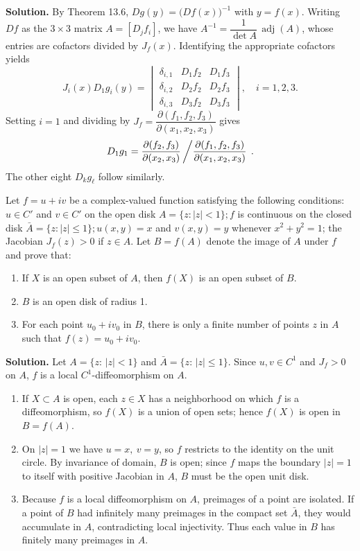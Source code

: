 \noindent\textbf{Solution.}
By Theorem 13.6, $Dg(y)=\big(Df(x)\big)^{-1}$ with $y=f(x)$. Writing $Df$ as the $3\times3$ matrix $A=[D_j f_i]$, we have $A^{-1}=\dfrac{1}{\det A}\,\operatorname{adj}(A)$, whose entries are cofactors divided by $J_f(x)$. Identifying the appropriate cofactors yields
\[J_i(x)D_1g_i(y)=\begin{vmatrix}
\delta_{i,1} & D_1f_2 & D_1f_3\\
\delta_{i,2} & D_2f_2 & D_2f_3\\
\delta_{i,3} & D_3f_2 & D_3f_3
\end{vmatrix},\quad i=1,2,3.
\]
Setting $i=1$ and dividing by $J_f=\dfrac{\partial(f_1,f_2,f_3)}{\partial(x_1,x_2,x_3)}$ gives
\[D_1g_1=\frac{\partial(f_2,f_3)}{\partial(x_2,x_3)}\left/\frac{\partial(f_1,f_2,f_3)}{\partial(x_1,x_2,x_3)}\right.\,.
\]
The other eight $D_k g_\ell$ follow similarly.

\begin{problembox}
Let \( f = u + iv \) be a complex-valued function satisfying the following conditions: \( u \in C' \) and \( v \in C' \) on the open disk \( A = \{z : |z| < 1\}; f \) is continuous on the closed disk \( \bar{A} = \{z : |z| \leq 1\}; u(x, y) = x \) and \( v(x, y) = y \) whenever \( x^2 + y^2 = 1 \); the Jacobian \( J_f(z) > 0 \) if \( z \in A \). Let \( B = f(A) \) denote the image of \( A \) under \( f \) and prove that:
\begin{enumerate}[label=(\alph*)]
    \item If \( X \) is an open subset of \( A \), then \( f(X) \) is an open subset of \( B \).
    \item \( B \) is an open disk of radius 1.
    \item For each point \( u_0 + iv_0 \) in \( B \), there is only a finite number of points \( z \) in \( A \) such that \( f(z) = u_0 + iv_0 \).
\end{enumerate}
\end{problembox}

\noindent\textbf{Solution.}
Let $A=\{z:\,|z|<1\}$ and $\bar A=\{z:\,|z|\le 1\}$. Since $u,v\in C^1$ and $J_f>0$ on $A$, $f$ is a local $C^1$-diffeomorphism on $A$.
\begin{enumerate}[label=(\alph*)]
    \item If $X\subset A$ is open, each $z\in X$ has a neighborhood on which $f$ is a diffeomorphism, so $f(X)$ is a union of open sets; hence $f(X)$ is open in $B=f(A)$.
    \item On $|z|=1$ we have $u=x,\ v=y$, so $f$ restricts to the identity on the unit circle. By invariance of domain, $B$ is open; since $f$ maps the boundary $|z|=1$ to itself with positive Jacobian in $A$, $B$ must be the open unit disk.
    \item Because $f$ is a local diffeomorphism on $A$, preimages of a point are isolated. If a point of $B$ had infinitely many preimages in the compact set $\bar A$, they would accumulate in $A$, contradicting local injectivity. Thus each value in $B$ has finitely many preimages in $A$.
\end{enumerate}

